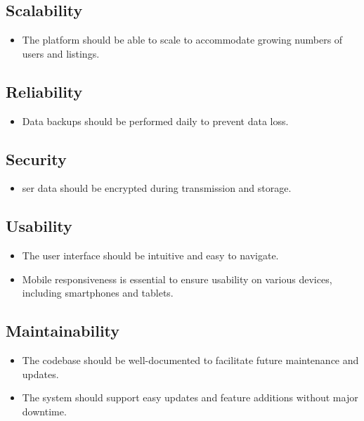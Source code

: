 \subsection{Scalability}
\begin{itemize}
        \item The platform should be able to scale to accommodate growing numbers of users and listings.
\end{itemize}

\subsection{Reliability}
\begin{itemize}
        \item Data backups should be performed daily to prevent data loss.
\end{itemize}

\subsection{Security}
\begin{itemize}
        \item ser data should be encrypted during transmission and storage.
\end{itemize}

\subsection{Usability}
\begin{itemize}
        \item The user interface should be intuitive and easy to navigate.
        \item Mobile responsiveness is essential to ensure usability on various devices, including smartphones and tablets.
\end{itemize}

\subsection{Maintainability}
\begin{itemize}
        \item The codebase should be well-documented to facilitate future maintenance and updates.
        \item The system should support easy updates and feature additions without major downtime.
\end{itemize}

